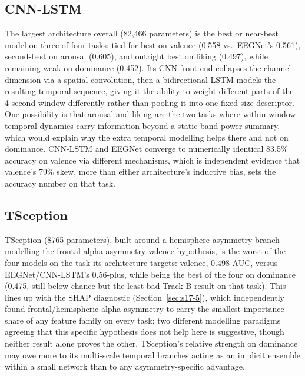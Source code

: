 \documentclass[11pt]{report}
\begin{document}
\subsection{CNN-LSTM}
The largest architecture overall (82{,}466 parameters) is the best or
near-best model on three of four tasks: tied for best on valence (0.558 vs.\
EEGNet's 0.561), second-best on arousal (0.605), and outright best on
liking (0.497), while remaining weak on dominance (0.452). Its CNN front
end collapses the channel dimension via a spatial convolution, then a
bidirectional LSTM models the resulting temporal sequence, giving it the
ability to weight different parts of the 4-second window differently rather
than pooling it into one fixed-size descriptor. One possibility is that
arousal and liking are the two tasks where within-window temporal dynamics
carry information beyond a static band-power summary, which would explain
why the extra temporal modelling helps there and not on dominance. CNN-LSTM
and EEGNet converge to numerically identical 83.5\% accuracy on valence via
different mechanisms, which is independent evidence that valence's 79\%
skew, more than either architecture's inductive bias, sets the accuracy
number on that task.

\subsection{TSception}
\label{sec:ma-tsception}
TSception (8765 parameters), built around a hemisphere-asymmetry branch
modelling the frontal-alpha-asymmetry valence hypothesis, is the worst of
the four models on the task its architecture targets: valence, 0.498 AUC,
versus EEGNet/CNN-LSTM's 0.56-plus, while being the best of the four on
dominance (0.475, still below chance but the least-bad Track B result on
that task). This lines up with the SHAP diagnostic (Section~\ref{sec:s17-5}),
which independently found frontal/hemispheric alpha asymmetry to carry the
smallest importance share of any feature family on every task: two
different modelling paradigms agreeing that this specific hypothesis does
not help here is suggestive, though neither result alone proves the other.
TSception's relative strength on dominance may owe more to its multi-scale
temporal branches acting as an implicit ensemble within a small network
than to any asymmetry-specific advantage.
\end{document}
